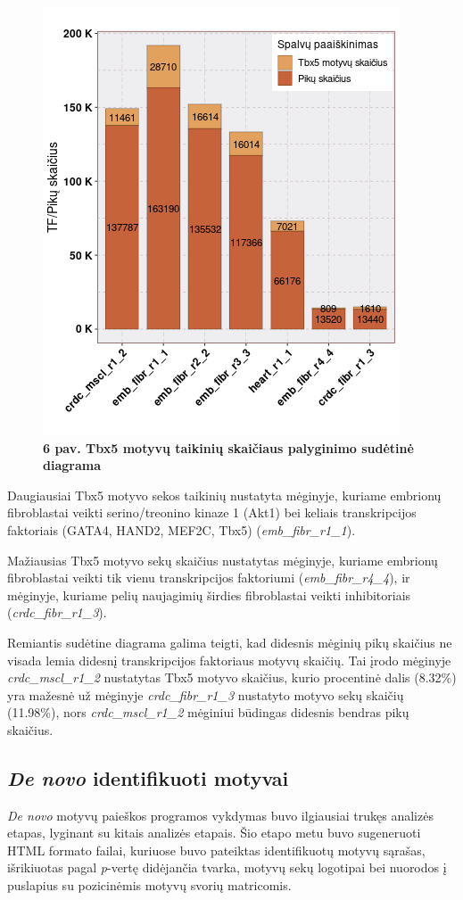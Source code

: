 \documentclass[12pt]{article}
\begin{document}
\begin{figure}[htb]
    \begin{center}
        \includegraphics[width=0.5\linewidth]{../Figures/tf_hit_percentage.png}
        \vspace{-2\baselineskip}
        \caption*{\small\textbf{6 pav. Tbx5 motyvų taikinių skaičiaus palyginimo
                                sudėtinė diagrama}}
    \end{center}
\end{figure}

Daugiausiai Tbx5 motyvo sekos taikinių nustatyta mėginyje,
kuriame embrionų fibroblastai veikti serino/treonino kinaze 1 (Akt1) bei
keliais transkripcijos faktoriais (GATA4, HAND2, MEF2C, Tbx5)
(\small\emph{emb\_fibr\_r1\_1}).

Mažiausias Tbx5 motyvo sekų skaičius nustatytas mėginyje, kuriame embrionų
fibroblastai veikti tik vienu transkripcijos faktoriumi
(\small\emph{emb\_fibr\_r4\_4}), ir mėginyje, kuriame pelių naujagimių
širdies fibroblastai veikti inhibitoriais
(\small\emph{crdc\_fibr\_r1\_3}).

Remiantis sudėtine diagrama galima teigti, kad didesnis mėginių pikų skaičius
ne visada lemia didesnį transkripcijos faktoriaus motyvų skaičių. Tai įrodo
mėginyje \small\emph{crdc\_mscl\_r1\_2} nustatytas Tbx5 motyvo skaičius,
kurio procentinė dalis (8.32\%) yra mažesnė už mėginyje
\small\emph{crdc\_fibr\_r1\_3} nustatyto motyvo sekų skaičių (11.98\%),
nors \small\emph{crdc\_mscl\_r1\_2} mėginiui būdingas didesnis bendras pikų
skaičius.

\newpage

\subsection{\emph{De novo} identifikuoti motyvai}
\emph{De novo} motyvų paieškos programos vykdymas buvo ilgiausiai trukęs
analizės etapas, lyginant su kitais analizės etapais. Šio etapo metu buvo
sugeneruoti HTML formato failai, kuriuose buvo pateiktas identifikuotų motyvų
sąrašas, išrikiuotas pagal \emph{p}-vertę didėjančia tvarka, motyvų sekų
logotipai bei nuorodos į puslapius su pozicinėmis motyvų svorių matricomis.
\end{document}
